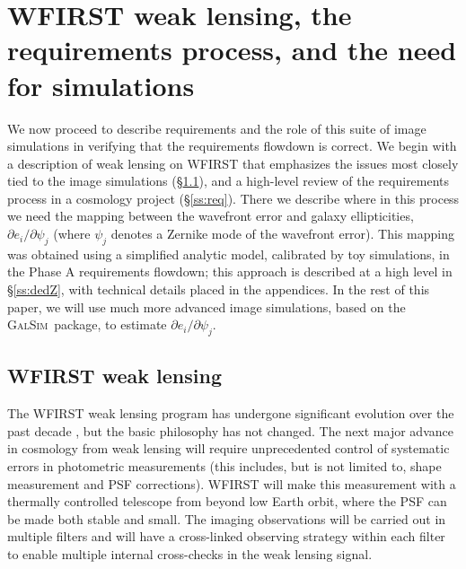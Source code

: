 \documentclass[aps,prd, amsmath,amssymb,superscriptaddress,showkeys,nofootinbib,reprint,preprintnumbers]{revtex4-1}
\newcommand{\galsim}{\textsc{GalSim}}
\begin{document}
\section{WFIRST weak lensing, the requirements process, and the need for simulations}
\label{sec:wfirst}

We now proceed to describe requirements and the role of this suite of image simulations in verifying that the requirements flowdown is correct. We begin with a description of weak lensing on WFIRST that emphasizes the issues most closely tied to the image simulations (\S\ref{ss:wlprog}), and a high-level review of the requirements process in a cosmology project (\S\ref{ss:req}). There we describe where in this process we need the mapping between the wavefront error and galaxy ellipticities, $\partial e_i/\partial \psi_j$ (where $\psi_j$ denotes a Zernike mode of the wavefront error). This mapping was obtained using a simplified analytic model, calibrated by toy simulations, in the Phase A requirements flowdown; this approach is described at a high level in \S\ref{ss:dedZ}, with technical details placed in the appendices. In the rest of this paper, we will use much more advanced image simulations, based on the \galsim\ package, to estimate $\partial e_i/\partial \psi_j$.

\subsection{WFIRST weak lensing}
\label{ss:wlprog}

The WFIRST weak lensing program has undergone significant evolution over the past decade \cite{2011arXiv1108.1374G, 2012arXiv1208.4012G, 2013arXiv1305.5422S, 2015arXiv150303757S, 2018arXiv180403628D, 2019arXiv190205569A}, but the basic philosophy has not changed. The next major advance in cosmology from weak lensing will require unprecedented control of systematic errors in photometric measurements (this includes, but is not limited to, shape measurement and PSF corrections). WFIRST will make this measurement with a thermally controlled telescope from beyond low Earth orbit, where the PSF can be made both stable and small. The imaging observations will be carried out in multiple filters and will have a cross-linked observing strategy within each filter to enable multiple internal cross-checks in the weak lensing signal.
\end{document}
